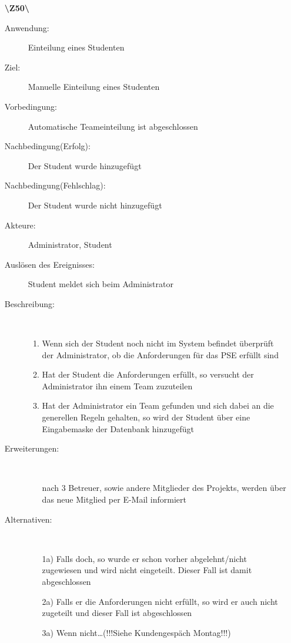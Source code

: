 \documentclass[a4paper]{article}
\begin{document}
\begin{enumerate}
  \item[\textbf{\textbackslash Z50\textbackslash}] \begin{description}
  \item[Anwendung:] Einteilung eines Studenten
  \item[Ziel:] Manuelle Einteilung eines Studenten
  	\item[Vorbedingung:] Automatische Teameinteilung ist abgeschlossen
  	\item[Nachbedingung(Erfolg):] Der Student wurde hinzugefügt
  	\item[Nachbedingung(Fehlschlag):] Der Student wurde nicht hinzugefügt
  	\item[Akteure:] Administrator, Student
  	\item[Auslösen des Ereignisses:] Student meldet sich beim Administrator
  	\item[Beschreibung:]~
  	 \begin{enumerate}[1.]
  	   \item Wenn sich der Student noch nicht im System befindet überprüft der
  	   Administrator, ob die Anforderungen für das PSE erfüllt sind
  	   \item Hat der Student die Anforderungen erfüllt, so versucht der
  	   Administrator ihn einem Team zuzuteilen
  	   \item Hat der Administrator ein Team gefunden und sich dabei an die
  	   generellen Regeln gehalten, so wird der Student über eine Eingabemaske der
  	   Datenbank hinzugefügt
  	 \end{enumerate}
  	\item[Erweiterungen:]~
  	 \begin{enumerate}
  	   \item [nach 3] Betreuer, sowie andere Mitglieder des Projekts, werden
  	   über das neue Mitglied per E-Mail informiert 
  	 \end{enumerate}  
  	\item[Alternativen:] ~
  	 \begin{enumerate}
  	  \item[1a)] Falls doch, so wurde er schon vorher abgelehnt/nicht zugewiesen
  	  und wird nicht eingeteilt. Dieser Fall ist damit abgeschlossen
  	  \item [2a)] Falls er die Anforderungen nicht erfüllt, so wird er auch nicht
  	  zugeteilt und dieser Fall ist abgeschlossen
  	  \item[3a)] Wenn nicht\ldots (!!!Siehe Kundengespäch Montag!!!)
  	 \end{enumerate}  
  \end{description}




\end{enumerate}
\end{document}
